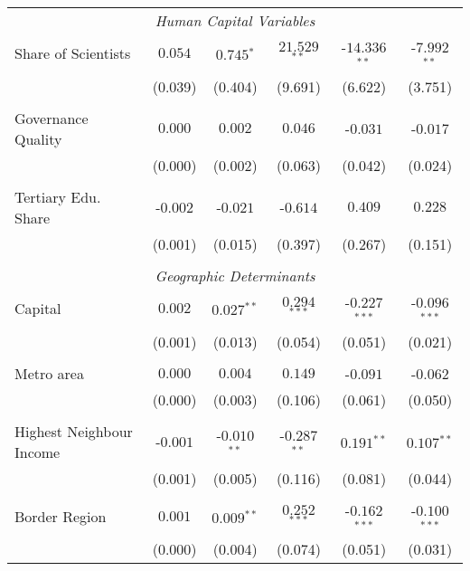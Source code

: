 \documentclass[11pt]{article}
\begin{document}
\begin{table}[!htbp]
{\begin{minipage}{\textwidth}
\begin{tabular}{@{\extracolsep{5pt}} lccccc}
\\
\multicolumn{6}{c}{\textit{Human Capital Variables}}\\
Share of Scientists & $0.054$ & $0.745$$^{*}$ & $21.529$$^{**}$ & $ $-$14.336$$^{**}$ & $ $-$7.992$$^{**}$ \\
& (0.039) &  (0.404) & (9.691) & (6.622) & (3.751)\\
&\\
Governance Quality & $0.000$ & $0.002$ & $0.046$ & $ $-$0.031$ & $ $-$0.017$ \\
& (0.000) &  (0.002) & (0.063) & (0.042) & (0.024)\\
&\\
Tertiary Edu. Share  & $ $-$0.002$ & $ $-$0.021$ & $ $-$0.614$ & $0.409$ & $0.228$ \\
& (0.001) &  (0.015) & (0.397) & (0.267) & (0.151)\\
\\
\multicolumn{6}{c}{\textit{Geographic Determinants}}\\
Capital & $0.002$ & $0.027$$^{**}$ & $0.294$$^{***}$ & $ $-$0.227$$^{***}$ & $ $-$0.096$$^{***}$ \\
& (0.001) &  (0.013) & (0.054) & (0.051) & (0.021)\\
&\\
Metro area & $0.000$ & $0.004$ & $0.149$ & $ $-$0.091$ & $ $-$0.062$ \\ 
& (0.000) &  (0.003) & (0.106) & (0.061) & (0.050)\\
&\\
Highest Neighbour Income & $ $-$0.001$ & $ $-$0.010$$^{**}$ & $ $-$0.287$$^{**}$ & $0.191$$^{**}$ & $0.107$$^{**}$ \\
& (0.001) &  (0.005) & (0.116) & (0.081) & (0.044)\\
&\\
Border Region & $0.001$ & $0.009$$^{**}$ & $0.252$$^{***}$ & $ $-$0.162$$^{***}$ & $ $-$0.100$$^{***}$ \\ 
& (0.000) &  (0.004) & (0.074) & (0.051) & (0.031)\\


\end{tabular}
\end{minipage}}
\end{table}
\end{document}
